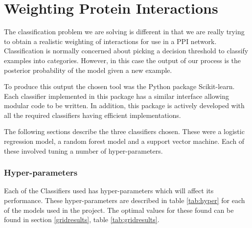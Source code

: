 \section{Weighting Protein Interactions}

The classification problem we are solving is different in that we are really trying to obtain a realistic weighting of interactions for use in a PPI network.
Classification is normally concerned about picking a decision threshold to classify examples into categories.
However, in this case the output of our process is the posterior probability of the model given a new example.

To produce this output the chosen tool was the Python package Scikit-learn\autocite{pedregosa_scikit-learn:_2011}.
Each classifier implemented in this package has a similar interface allowing modular code to be written.
In addition, this package is actively developed with all the required classifiers having efficient implementations.

The following sections describe the three classifiers chosen.
These were a logistic regression model, a random forest model and a support vector machine.
Each of these involved tuning a number of hyper-parameters.

\subsubsection*{Hyper-parameters}
Each of the Classifiers used has hyper-parameters which will affect its performance.
These hyper-parameters are described in table \ref{tab:hyper} for each of the models used in the project.
The optimal values for these found can be found in section \ref{gridresults}, table \ref{tab:gridresults}.

